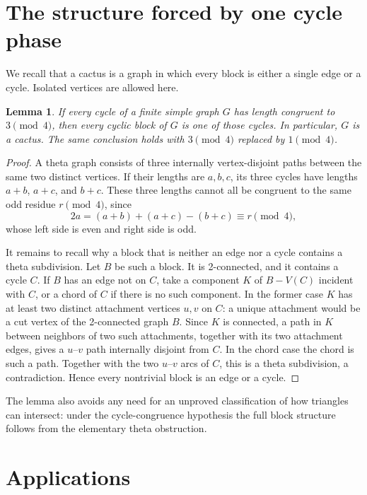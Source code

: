 \documentclass[11pt]{article}
\newtheorem{lemma}[theorem]{Lemma}
\theoremstyle{definition}
\theoremstyle{remark}
\begin{document}
\section{The structure forced by one cycle phase}\label{sec:structure}

We recall that a cactus is a graph in which every block is either a
single edge or a cycle.  Isolated vertices are allowed here.

\begin{lemma}\label{lem:cactus}
If every cycle of a finite simple graph $G$ has length congruent to
$3\pmod4$, then every cyclic block of $G$ is one of those cycles.  In
particular, $G$ is a cactus.  The same conclusion holds with
$3\pmod4$ replaced by $1\pmod4$.
\end{lemma}

\begin{proof}
A theta graph consists of three internally vertex-disjoint paths between
the same two distinct vertices.  If their lengths are $a,b,c$, its three
cycles have lengths $a+b$, $a+c$, and $b+c$.  These three lengths cannot
all be congruent to the same odd residue $r\pmod4$, since
\[
 2a=(a+b)+(a+c)-(b+c)\equiv r\pmod4,
\]
whose left side is even and right side is odd.

It remains to recall why a block that is neither an edge nor a cycle
contains a theta subdivision.  Let $B$ be such a block.  It is
2-connected, and it contains a cycle $C$.  If $B$ has an edge not on
$C$, take a component $K$ of $B-V(C)$ incident with $C$, or a chord of
$C$ if there is no such component.  In the former case $K$ has at least
two distinct attachment vertices $u,v$ on $C$: a unique attachment would
be a cut vertex of the 2-connected graph $B$.  Since $K$ is connected, a
path in $K$ between neighbors of two such attachments, together with its
two attachment edges, gives a $u$--$v$ path internally disjoint from $C$.
In the chord case the chord
is such a path.  Together with the two $u$--$v$ arcs of $C$, this is a
theta subdivision, a contradiction.  Hence every nontrivial block is an
edge or a cycle.
\end{proof}

The lemma also avoids any need for an unproved classification of how
triangles can intersect: under the cycle-congruence hypothesis the full
block structure follows from the elementary theta obstruction.

\section{Applications}\label{sec:applications}
\end{document}
